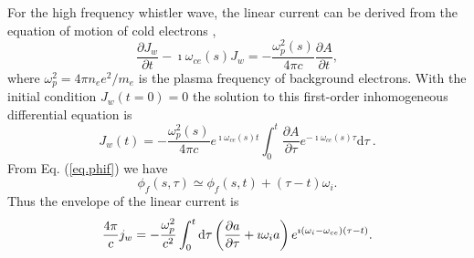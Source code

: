 For  the high frequency whistler wave, 
the linear current can be derived from the equation of motion of cold electrons \cite{stix1992},
\begin{equation}
    \frac{\partial J_w}{\partial t}-\imath \omega_{c e}(s) J_w=-\frac{\omega_{p}^{2}(s)}{4 \pi c} \frac{\partial A}{\partial t},
\end{equation}
where 
$\omega^2_{p} = 4 \pi n_{e} e^2 /m_e$
is the plasma frequency of background electrons.
With the initial condition $J_w(t=0) = 0$ the  solution to this first-order inhomogeneous differential equation is
\begin{equation}
    J_w(t) = - \frac{\omega_{p}^2(s)}{4 \pi c}  e^{\imath \omega_{ce}(s)t} \int_0^t \frac{\partial A}{\partial \tau} e^{-\imath \omega_{ce}(s)\tau} \mathrm{d} \tau  ~.
\end{equation}
From Eq. (\ref{eq.phif}) we have 
\begin{equation}
    \phi_f(s,\tau) \simeq \phi_f(s,t) +  (\tau-t) \omega_{i}.
\end{equation}
Thus 
 the envelope of the linear current is 
\begin{equation}
 {4 \pi \over c}   j_w = -\frac{\omega_p^2}{ c^2}\int_0^t \mathrm{d} \tau \left(\frac{\partial a}{\partial \tau} + \imath \omega_i a\right)e^{\imath 
(\omega_i - \omega_{ce})(\tau-t)}.
\end{equation}
